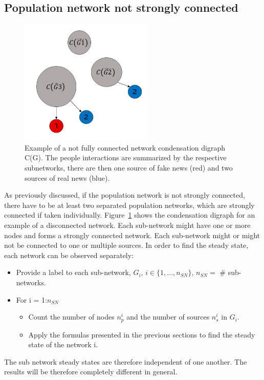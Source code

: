 \subsection{Population network not strongly connected}
\begin{figure}[!t]
	\centering
	\includegraphics[width=2.5in]{Figures/not_strongly_connected.png}
	\caption{Example of a not fully connected network condensation digraph C(G). The people interactions are summarized by the respective subnetworks, there are then one source of fake news (red) and two sources of real news (blue).}
	\label{pics:nonconnectednetwork}
\end{figure}
As previously discussed, if the population network is not strongly connected, there have to be at least two separated population networks, which are strongly connected if taken individually. Figure~\ref{pics:nonconnectednetwork} shows the condensation digraph for an example of a disconnected network. Each sub-network might have one or more nodes and forms a strongly connected network. Each sub-network might or might not be connected to one or multiple sources. \newline
In order to find the steady state, each network can be observed separately:
\begin{itemize}
	\item 
	Provide a label to each sub-network, $G_i$, $i\in\{1,...,n_{SN}\}$, $n_{SN}=$ $\#$ sub-networks.
	\item 
	For i = 1:$n_{SN}$
	\begin{itemize}
		\item 
		Count the number of nodes $n_p^i$ and the number of sources $n_s^i$ in $G_i$. 
		\item 
		Apply the formulas presented in the previous sections to find the steady state of the network i.
	\end{itemize}
\end{itemize}
The sub network steady states are therefore independent of one another. The results will be therefore completely different in general. 